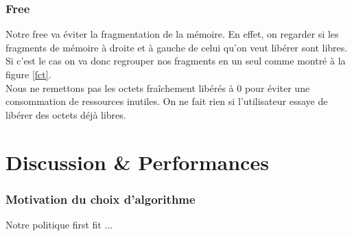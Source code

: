 \documentclass{article}
\begin{document}
\subsubsection{Free}
\label{free}
Notre free va éviter la fragmentation de la mémoire. En effet, on regarder si les fragments de mémoire à droite et à gauche de celui qu'on veut libérer sont libres. Si c'est le cas on va donc regrouper nos fragments en un seul comme montré à la figure \ref{fct}.\\
Nous ne remettons pas les octets fraîchement libérés à 0 pour éviter une consommation de ressources inutiles. On ne fait rien si l'utilisateur essaye de libérer des octets déjà libres.


\section{Discussion \& Performances}
\label{perf}

\subsubsection*{Motivation du choix d'algorithme}
Notre politique first fit ...
\end{document}
